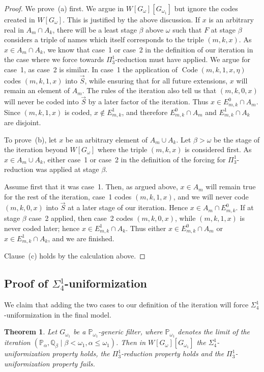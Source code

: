 \documentclass[a4paper,11pt]{article}
\newtheorem{theorem}{Theorem}[section]
\newcommand{\forceP}{\mathbb{P}}
\newcommand{\forceQ}{\mathbb{Q}}
\begin{document}
\begin{proof}
We prove~(a) first. We argue in $W[G_\omega][G_{\omega_1}]$ but ignore the codes created in $W[G_\omega]$. This is justified by the above discussion. If $x$ is an arbitrary real in $A_m\cap A_k$, there will be a least stage $\beta$ above $\omega$ such that $F$ at stage $\beta$ considers a triple of names which itself corresponds to the triple $(m,k,x)$. As $x\in A_m\cap A_k$, we know that case~1 or case~2 in the definition of our iteration in the case where we force towards $\Pi^1_3$-reduction must have applied. We argue for case~1, as case~2 is similar. In case~1 the application of $\operatorname{Code}(m,k,1,x,\eta)$ codes $(m,k,1,x)$ into $\vec S$, while ensuring that for all future extensions, $x$ will remain an element of $A_m$. The rules of the iteration also tell us that $(m,k,0,x)$ will never be coded into $\vec S$ by a later factor of the iteration. Thus $x\in E^0_{m,k}\cap A_m$. Since $(m,k,1,x)$ is coded, $x\notin E^1_{m,k}$, and therefore $E^0_{m,k}\cap A_m$ and $E^1_{m,k}\cap A_k$ are disjoint.

To prove~(b), let $x$ be an arbitrary element of $A_m\cup A_k$. Let $\beta>\omega$ be the stage of the iteration beyond $W[G_\omega]$ where the triple $(m,k,x)$ is considered first. As $x\in A_m\cup A_k$, either case~1 or case~2 in the definition of the forcing for $\Pi^1_3$-reduction was applied at stage $\beta$.

Assume first that it was case~1. Then, as argued above, $x\in A_m$ will remain true for the rest of the iteration, case~1 codes $(m,k,1,x)$, and we will never code $(m,k,0,x)$ into $\vec S$ at a later stage of our iteration. Hence $x\in A_m\cap E^0_{m,k}$. If at stage $\beta$ case~2 applied, then case~2 codes $(m,k,0,x)$, while $(m,k,1,x)$ is never coded later; hence $x\in E^1_{m,k}\cap A_k$. Thus either $x\in E^0_{m,k}\cap A_m$ or $x\in E^1_{m,k}\cap A_k$, and we are finished.

Clause~(c) holds by the calculation above.
\end{proof}

\subsection{Proof of \texorpdfstring{$\Sigma^1_4$}{Sigma14}-uniformization}

We claim that adding the two cases to our definition of the iteration will force $\Sigma^1_4$-uniformization in the final model.

\begin{theorem}
Let $G_{\omega_1}$ be a $\forceP_{\omega_1}$-generic filter, where $\forceP_{\omega_1}$ denotes the limit of the iteration $(\forceP_\alpha,\forceQ_\beta\mid\beta<\omega_1,\alpha\leq\omega_1)$.
Then in $W[G_\omega][G_{\omega_1}]$ the $\Sigma^1_4$-uniformization property holds, the $\Pi^1_3$-reduction property holds and the $\Pi^1_3$-uniformization property fails.
\end{theorem}
\end{document}
